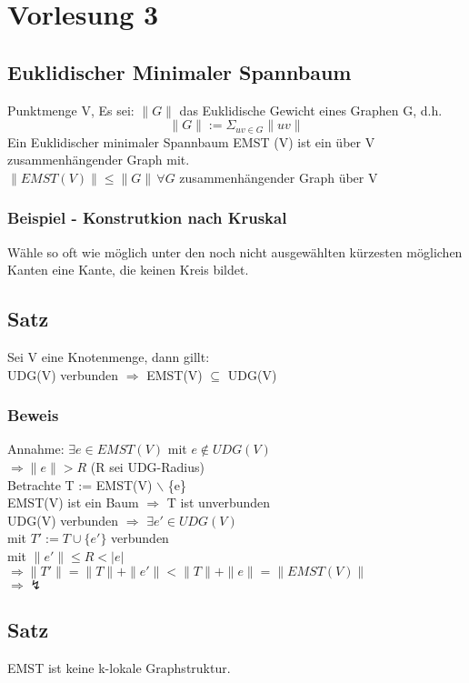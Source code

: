 \documentclass{article}
\begin{document}
	
	

\section{Vorlesung 3}
\subsection*{Euklidischer Minimaler Spannbaum}
Punktmenge V, Es sei: $\|G\|$ das Euklidische Gewicht eines Graphen G,
d.h. 
\[
\|G\| := \Sigma_{uv \in G} \|uv\|
\]
Ein Euklidischer minimaler Spannbaum EMST (V) ist ein über V zusammenhängender Graph mit.\\

$\|EMST(V)\| \leq \|G\| \, \forall G $ zusammenhängender Graph über V

\subsubsection*{Beispiel - Konstrutkion nach Kruskal}
Wähle so oft wie möglich unter den noch nicht ausgewählten kürzesten möglichen Kanten eine Kante, die keinen Kreis bildet.

\subsection*{Satz}
Sei V eine Knotenmenge, dann gillt: \\
UDG(V) verbunden $\Rightarrow$ EMST(V) $\subseteq$ UDG(V)

\subsubsection*{Beweis}
Annahme: $\exists e \in EMST(V)$ mit $e \not\in UDG(V)$ \\
$\Rightarrow \|e\| > R$ (R sei UDG-Radius)\\
Betrachte T := EMST(V) $\backslash$ \{e\} \\
EMST(V) ist ein Baum $\Rightarrow$ T ist unverbunden\\
UDG(V) verbunden $\Rightarrow$ $\exists e' \in UDG(V)$ \\
mit $T' := T \cup \{e'\}$ verbunden\\
mit $\|e'\| \leq R < |e|$ \\
$\Rightarrow \|T'\| = \|T\|+\|e'\| < \|T\|+\|e\| = \|EMST(V)\|$\\
$\Rightarrow \lightning$ \\


\subsection*{Satz}
EMST ist keine k-lokale Graphstruktur.\\
\end{document}
